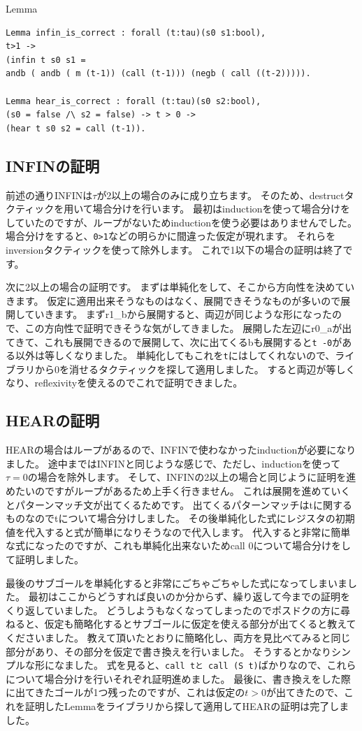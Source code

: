 \documentclass{jsbook}
\begin{document}
\begin{itembox}[l]{Lemma}
\begin{verbatim}
Lemma infin_is_correct : forall (t:tau)(s0 s1:bool), 
t>1 ->
(infin t s0 s1 = 
andb ( andb ( m (t-1)) (call (t-1))) (negb ( call ((t-2))))).

Lemma hear_is_correct : forall (t:tau)(s0 s2:bool),
(s0 = false /\ s2 = false) -> t > 0 ->
(hear t s0 s2 = call (t-1)).
\end{verbatim}
\end{itembox}

\subsection*{INFINの証明}
前述の通りINFINは$\tau$が2以上の場合のみに成り立ちます。
そのため、destructタクティックを用いて場合分けを行います。
最初はinductionを使って場合分けをしていたのですが、ループがないためinductionを使う必要はありませんでした。
場合分けをすると、\verb|0>1|などの明らかに間違った仮定が現れます。
それらをinversionタクティックを使って除外します。
これで1以下の場合の証明は終了です。

次に2以上の場合の証明です。
まずは単純化をして、そこから方向性を決めていきます。
仮定に適用出来そうなものはなく、展開できそうなものが多いので展開していきます。
まずr1\_bから展開すると、両辺が同じような形になったので、この方向性で証明できそうな気がしてきました。
展開した左辺にr0\_aが出てきて、これも展開できるので展開して、次に出てくるbも展開すると\verb|t -0|がある以外は等しくなりました。
単純化してもこれを\verb|t|にはしてくれないので、ライブラリから0を消せるタクティックを探して適用しました。
すると両辺が等しくなり、reflexivityを使えるのでこれで証明できました。

\subsection*{HEARの証明}
HEARの場合はループがあるので、INFINで使わなかったinductionが必要になりました。
途中まではINFINと同じような感じで、ただし、inductionを使って$\tau = 0$の場合を除外します。
そして、INFINの2以上の場合と同じように証明を進めたいのですがループがあるため上手く行きません。
これは展開を進めていくとパターンマッチ文が出てくるためです。
出てくるパターンマッチはtに関するものなのでtについて場合分けしました。
その後単純化した式にレジスタの初期値を代入すると式が簡単になりそうなので代入します。
代入すると非常に簡単な式になったのですが、これも単純化出来ないためcall 0について場合分けをして証明しました。

最後のサブゴールを単純化すると非常にごちゃごちゃした式になってしまいました。
最初はここからどうすれば良いのか分からず、繰り返して今までの証明をくり返していました。
どうしようもなくなってしまったのでポスドクの方に尋ねると、仮定も簡略化するとサブゴールに仮定を使える部分が出てくると教えてくださいました。
教えて頂いたとおりに簡略化し、両方を見比べてみると同じ部分があり、その部分を仮定で書き換えを行いました。
そうするとかなりシンプルな形になました。
式を見ると、\verb|call tと call (S t)|ばかりなので、これらについて場合分けを行いそれぞれ証明進めました。
最後に、書き換えをした際に出てきたゴールが1つ残ったのですが、これは仮定の$t>0$が出てきたので、これを証明したLemmaをライブラリから探して適用してHEARの証明は完了しました。
\end{document}

